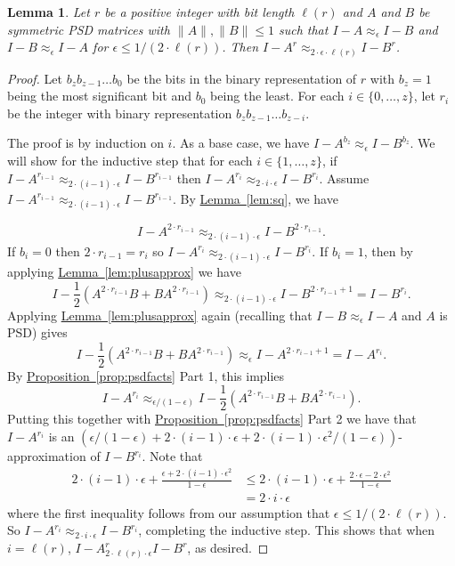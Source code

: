 \documentclass[11pt]{article}
\numberwithin{equation}{section}
\newtheorem{lemma}[theorem]{Lemma}
\theoremstyle{definition}
\theoremstyle{plain}
\newcommand{\expref}[2]{\hyperref[#2]{#1~\ref{#2}}}
\numberwithin{myalgctr}{section}
\theoremstyle{named}
\begin{document}
\begin{lemma}
\label{lem:allpowersapprox}
Let $r$ be a positive integer with bit length $\ell(r)$ and $A$ and $B$ be symmetric PSD matrices with $\|A\|,\|B\|\leq 1$ such that $I-A\approx_{\epsilon}I-B$ and $I-B\approx_{\epsilon}I-A$ for $\epsilon\leq 1/(2\cdot \ell(r))$. Then $I-A^r\approx_{2\cdot\epsilon\cdot \ell(r)}I-B^r$. 
\end{lemma}
\begin{proof} 
Let $b_zb_{z-1}\ldots b_0$ be the bits in the binary representation of $r$ with $b_z=1$ being the most significant bit and $b_0$ being the least. For each $i\in \{0,\ldots,z\}$, let $r_i$ be the integer with binary representation $b_zb_{z-1}\ldots b_{z-i}$. 

The proof is by induction on $i$. As a base case, we have $I-A^{b_z}\approx_{\epsilon}I-B^{b_z}$. We will show for the inductive step that for each $i\in\{1,\ldots,z\}$, if $I-A^{r_{i-1}}\approx_{2\cdot (i-1)\cdot\epsilon}I-B^{r_{i-1}}$ then $I-A^{r_{i}}\approx_{2\cdot i\cdot\epsilon}I-B^{r_{i}}$. Assume $I-A^{r_{i-1}}\approx_{2\cdot (i-1)\cdot\epsilon}I-B^{r_{i-1}}$. By \expref{Lemma}{lem:sq}, we have 

\[
I-A^{2\cdot r_{i-1}}\approx_{2\cdot (i-1)\cdot\epsilon}I-B^{2\cdot r_{i-1}}.
\]
If $b_i=0$ then $2\cdot r_{i-1}=r_i$ so $I-A^{r_i}\approx_{2\cdot (i-1)\cdot\epsilon}I-B^{r_i}$. If $b_i=1$, then by applying \expref{Lemma}{lem:plusapprox} we have 
\[
I-\frac{1}{2}(A^{2\cdot r_{i-1}}B+BA^{2\cdot r_{i-1}})\approx_{2\cdot (i-1)\cdot\epsilon}I-B^{2\cdot r_{i-1}+1}=I-B^{r_i}.
\]
Applying \expref{Lemma}{lem:plusapprox} again (recalling that $I-B\approx_{\epsilon}I-A$ and $A$ is PSD) gives
\[
I-\frac{1}{2}(A^{2\cdot r_{i-1}}B+BA^{2\cdot r_{i-1}})\approx_{\epsilon}I-A^{2\cdot r_{i-1}+1}=I-A^{r_i}.
\]
By \expref{Proposition}{prop:psdfacts} Part 1, this implies 
\[
I-A^{r_i}\approx_{\epsilon/(1-\epsilon)} I-\frac{1}{2}(A^{2\cdot r_{i-1}}B+BA^{2\cdot r_{i-1}}).
\]
Putting this together with \expref{Proposition}{prop:psdfacts} Part 2 we have that $I-A^{r_i}$ is an $(\epsilon/(1-\epsilon)+2\cdot (i-1)\cdot\epsilon+2\cdot (i-1)\cdot\epsilon^2/(1-\epsilon))$-approximation of $I-B^{r_i}$. Note that
\begin{align*}
2\cdot (i-1)\cdot\epsilon+\frac{\epsilon+2\cdot (i-1)\cdot\epsilon^2}{1-\epsilon}&\leq 2\cdot (i-1)\cdot\epsilon+\frac{2\cdot\epsilon-2\cdot\epsilon^2}{1-\epsilon}\\
&=2\cdot i \cdot \epsilon
\end{align*}
where the first inequality follows from our assumption that $\epsilon\leq 1/(2\cdot \ell(r))$. So $I-A^{r_i} \approx_{2\cdot i\cdot \epsilon}I-B^{r_i}$, completing the inductive step. This shows that when $i=\ell(r)$, $I-A^{r}_{2\cdot \ell(r)\cdot \epsilon}I-B^{r}$, as desired. 
\end{proof}
\end{document}
